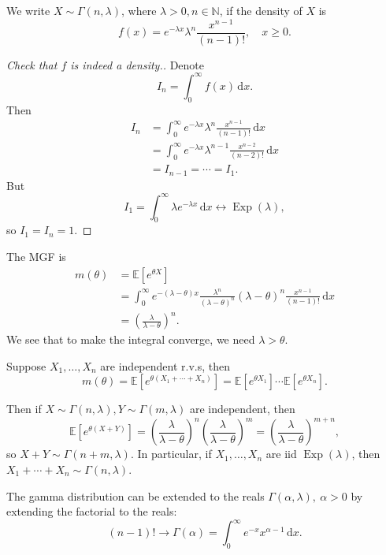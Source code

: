 \begin{example}
    We write $ X \sim \Gamma(n,\lambda) $, where $ \lambda>0, n\in \mathbb{N} $, if the density of $X$ is 
    \[
        f(x)=e^{-\lambda x}\lambda^n\frac{x^{n-1}}{(n-1)!},\quad x\ge 0.
    \]
    \begin{proof}[Check that $f$ is indeed a density.]
        Denote 
        \[
            I_n = \int_{0}^{\infty} f(x) \,\mathrm{d}x.
        \]
        Then 
        \begin{align*}
            I_n &= \int_{0}^{\infty} e^{-\lambda x}\lambda^n\frac{x^{n-1}}{(n-1)!} \,\mathrm{d}x\\ 
            &= \int_{0}^{\infty} e^{-\lambda x}\lambda^{n-1}\frac{x^{n-2}}{(n-2)!} \,\mathrm{d}x\\ 
            &= I_{n-1}=\cdots = I_1.
        \end{align*}
        But 
        \[
            I_1 = \int_{0}^{\infty} \lambda e^{-\lambda x} \,\mathrm{d}x \leftrightarrow \operatorname{Exp}(\lambda),
        \]
        so $I_1=I_n=1$. 
    \end{proof}
    
    The MGF is 
    \begin{align*}
        m(\theta)&=\mathbb E[e^{\theta X}]\\
        &=\int_0^\infty e^{-(\lambda-\theta)x}\frac{\lambda^n}{(\lambda-\theta)^n}(\lambda-\theta)^n\frac{x^{n-1}}{(n-1)!}\,\mathrm dx\\
        &=\left(\frac{\lambda}{\lambda-\theta} \right)^n.
    \end{align*}
    We see that to make the integral converge, we need $ \lambda>\theta $.

    \begin{claim}
        Suppose $ X_1,\dots,X_n $ are independent r.v.s, then 
        \[
            m(\theta)=\mathbb E[e^{\theta(X_1+\cdots+X_n)}]=\mathbb E[e^{\theta X_1}]\cdots\mathbb E[e^{\theta X_n}].
        \]
    \end{claim}

    Then if $X\sim\Gamma(n,\lambda),Y\sim\Gamma(m,\lambda)$ are independent, then
    \[
        \mathbb E[e^{\theta(X+Y)}]=\left(\frac{\lambda}{\lambda-\theta} \right)^n\left(\frac{\lambda}{\lambda-\theta} \right)^m=\left(\frac{\lambda}{\lambda-\theta} \right)^{m+n},
    \]
    so $ X+Y \sim \Gamma(n+m,\lambda) $.
    In particular, if $X_1,\ldots,X_n$ are iid $\operatorname{Exp}(\lambda)$, then $X_1+\cdots+X_n\sim\Gamma(n,\lambda)$.

    The gamma distribution can be extended to the reals $ \Gamma(\alpha,\lambda),\ \alpha>0 $ by extending the factorial to the reals:
    \[
        (n-1)! \longrightarrow \Gamma(\alpha) = \int_{0}^{\infty} e^{-x}x^{\alpha-1} \,\mathrm{d}x.
    \]
\end{example}

